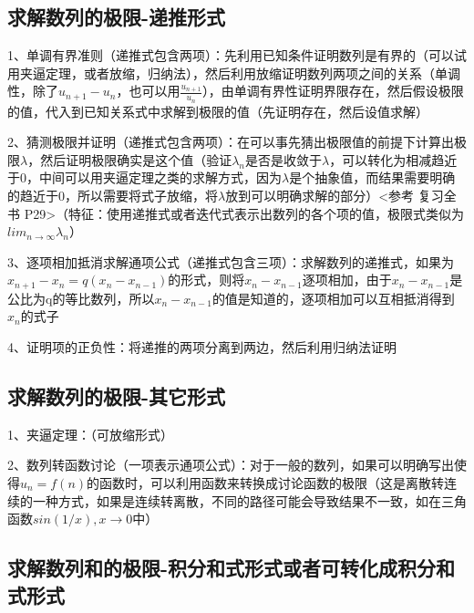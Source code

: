 \subsection{求解数列的极限-递推形式}

1、单调有界准则（递推式包含两项）：先利用已知条件证明数列是有界的（可以试用夹逼定理，或者放缩，归纳法），然后利用放缩证明数列两项之间的关系（单调性，除了$u_{n+1}-u_{n}$，也可以用$\frac{u_{n+1}}{u_{n}}$），由单调有界性证明界限存在，然后假设极限的值，代入到已知关系式中求解到极限的值（先证明存在，然后设值求解）

2、猜测极限并证明（递推式包含两项）：在可以事先猜出极限值的前提下计算出极限$\lambda$，然后证明极限确实是这个值（验证$\lambda_n$是否是收敛于$\lambda$，可以转化为相减趋近于0，中间可以用夹逼定理之类的求解方式，因为$\lambda$是个抽象值，而结果需要明确的趋近于0，所以需要将式子放缩，将$\lambda$放到可以明确求解的部分）<参考 复习全书 P29>（特征：使用递推式或者迭代式表示出数列的各个项的值，极限式类似为$lim_{n \rightarrow \infty}\lambda_n$）

3、逐项相加抵消求解通项公式（递推式包含三项）：求解数列的递推式，如果为$x_{n+1}-x_{n}=q(x_{n}-x_{n-1})$的形式，则将$x_{n}-x_{n-1}$逐项相加，由于$x_{n}-x_{n-1}$是公比为q的等比数列，所以$x_{n}-x_{n-1}$的值是知道的，逐项相加可以互相抵消得到$x_{n}$的式子

4、证明项的正负性：将递推的两项分离到两边，然后利用归纳法证明



\subsection{求解数列的极限-其它形式}

1、夹逼定理：（可放缩形式）

2、数列转函数讨论（一项表示通项公式）：对于一般的数列，如果可以明确写出使得$u_{n}=f(n)$的函数时，可以利用函数来转换成讨论函数的极限（这是离散转连续的一种方式，如果是连续转离散，不同的路径可能会导致结果不一致，如在三角函数$sin(1/x),x \rightarrow 0$中）



\subsection{求解数列和的极限-积分和式形式或者可转化成积分和式形式}

